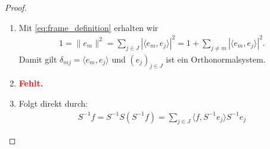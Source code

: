 \begin{proof}
	\begin{enumerate}
		\item Mit \eqref{eq:frame_definition} erhalten wir
		\begin{align*}
		1 = \| e_m \|^2 = \sum \limits_{j \in J} | \langle e_m,e_j \rangle|^2 
		= 1 + \sum \limits_{j \neq m} | \langle e_m,e_j \rangle|^2.
		\end{align*}
		Damit gilt $ \delta_{mj} = \langle e_m,e_j \rangle $ und $ (e_j)_{j \in J} $ ist ein Orthonormalsystem.
		
		
		\item
		\textcolor{red}{\textbf{Fehlt.}} 
		
		\item 
		Folgt direkt durch:
		\begin{align*}
		S^{-1} f = S^{-1} S (S^{-1} f) = 
		\sum \limits_{j \in J}
		\langle f, S^{-1} e_j \rangle S^{-1} e_j
		\end{align*}
		
	\end{enumerate}
\end{proof}
